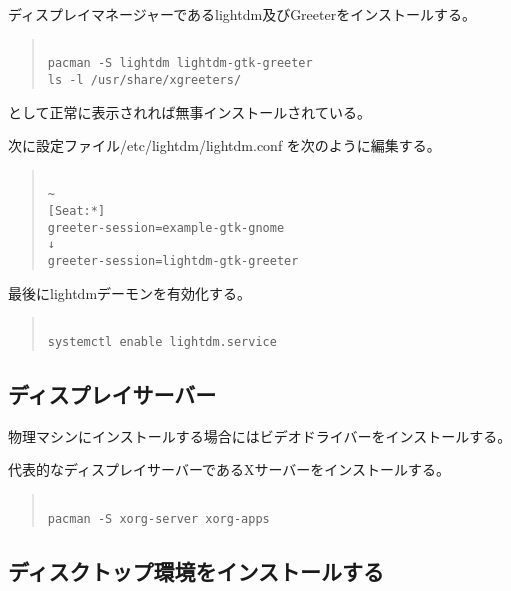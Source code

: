 \documentclass[dvipdfmx]{jsarticle}
\begin{document}
ディスプレイマネージャーであるlightdm及びGreeterをインストールする。

\begin{quote}
\begin{verbatim}

pacman -S lightdm lightdm-gtk-greeter
ls -l /usr/share/xgreeters/

\end{verbatim}
\end{quote}

として正常に表示されれば無事インストールされている。

次に設定ファイル/etc/lightdm/lightdm.conf を次のように編集する。

\begin{quote}
\begin{verbatim}

~
[Seat:*]
greeter-session=example-gtk-gnome　
↓
greeter-session=lightdm-gtk-greeter　

\end{verbatim}
\end{quote}


最後にlightdmデーモンを有効化する。

\begin{quote}
\begin{verbatim}

systemctl enable lightdm.service

\end{verbatim}
\end{quote}

\subsection{ディスプレイサーバー}

物理マシンにインストールする場合にはビデオドライバーをインストールする。


代表的なディスプレイサーバーであるXサーバーをインストールする。

\begin{quote}
\begin{verbatim}

pacman -S xorg-server xorg-apps

\end{verbatim}
\end{quote}

\subsection{ディスクトップ環境をインストールする}
\end{document}
